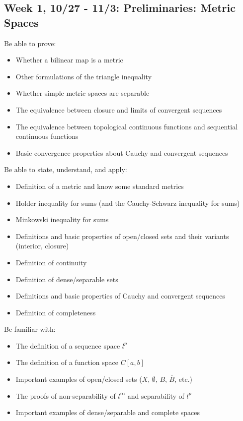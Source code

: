 \documentclass[course=Introduction\ to\ Functional\ Analysis, semester=Fall\ 2021]{syllabustemplate}
\begin{document}
{\parindent0pt

\subsection{Week 1, 10/27 - 11/3: Preliminaries: Metric Spaces}
\label{sub:week_1_10_27_-_11_3_preliminaries_metric_spaces}

Be able to prove:
\begin{itemize}
	\item Whether a bilinear map is a metric
	\item Other formulations of the triangle inequality
	\item Whether simple metric spaces are separable
	\item The equivalence between closure and limits of convergent sequences
	\item The equivalence between topological continuous functions and sequential continuous functions
	\item Basic convergence properties about Cauchy and convergent sequences
\end{itemize}

Be able to state, understand, and apply:
\begin{itemize}
	\item Definition of a metric and know some standard metrics
	\item Holder inequality for sums (and the Cauchy-Schwarz inequality for sums)
	\item Minkowski inequality for sums
	\item Definitions and basic properties of open/closed sets and their variants (interior, closure)
	\item Definition of continuity
	\item Definition of dense/separable sets
	\item Definitions and basic properties of Cauchy and convergent sequences
	\item Definition of completeness
\end{itemize}

Be familiar with:
\begin{itemize}
	\item The definition of a sequence space \(l^{p}\)
	\item The definition of a function space \(C[a,b]\)
	\item Important examples of open/closed sets (\(X\), \(\emptyset\), \(B\), \(\overline{B}\), etc.)
	\item The proofs of non-separability of \(l^{\infty}\) and separability of \(l^{p}\)
	\item Important examples of dense/separable and complete spaces
\end{itemize}
\vspace{1em}

}
\end{document}
